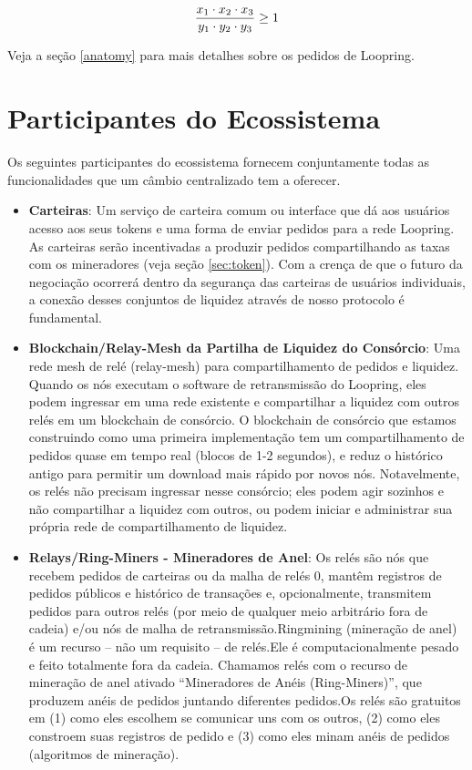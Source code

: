 \documentclass[UTF8,nofonts]{article}
\begin{document}
\begin{multicols}{2}
\begin{equation}
{{x_1 \cdot x_2 \cdot x_3 \over y_1 \cdot y_2 \cdot y_3} \geq 1}
\end{equation}


Veja a seção \ref{anatomy} para mais detalhes sobre os pedidos de Loopring.



\section{Participantes do Ecossistema\label{sec:ecosystem}}
Os seguintes participantes do ecossistema fornecem conjuntamente todas as funcionalidades que um câmbio centralizado tem a oferecer. 

\begin{itemize}

\item \textbf{Carteiras}: Um serviço de carteira comum ou interface que dá aos usuários acesso aos seus tokens e uma forma de enviar pedidos para a rede Loopring. As carteiras serão incentivadas a produzir pedidos compartilhando as taxas com os mineradores (veja seção \ref{sec:token}). Com a crença de que o futuro da negociação ocorrerá dentro da segurança das carteiras de usuários individuais, a conexão desses conjuntos de liquidez através de nosso protocolo é fundamental.

\item \textbf{Blockchain/Relay-Mesh da Partilha de Liquidez do Consórcio}: Uma rede mesh de relé (relay-mesh) para compartilhamento de pedidos e liquidez. Quando os nós executam o software de retransmissão do Loopring, eles podem ingressar em uma rede existente e compartilhar a liquidez com outros relés em um blockchain de consórcio. O blockchain de consórcio que estamos construindo como uma primeira implementação tem um compartilhamento de pedidos quase em tempo real  (blocos de 1-2 segundos), e reduz o histórico antigo para permitir um download mais rápido por novos nós. Notavelmente, os relés não precisam ingressar nesse consórcio; eles podem agir sozinhos e não compartilhar a liquidez com outros, ou podem iniciar e administrar sua própria rede de compartilhamento de liquidez.


\item \textbf{Relays/Ring-Miners - Mineradores de Anel}: 
Os relés são nós que recebem pedidos de carteiras ou da malha de relés 0,  mantêm registros de pedidos públicos e histórico de transações e, opcionalmente, transmitem pedidos para outros relés (por meio de qualquer meio arbitrário fora de cadeia) e/ou nós de malha de retransmissão.Ringmining (mineração de anel) é um recurso -- não um requisito -- de relés.Ele é computacionalmente pesado e feito totalmente fora da cadeia. Chamamos relés com o recurso de mineração de anel ativado “Mineradores de Anéis (Ring-Miners)”, que produzem anéis de pedidos juntando diferentes pedidos.Os relés são gratuitos em (1) como eles escolhem se comunicar uns com os outros, (2) como eles constroem suas registros de pedido e (3) como eles minam anéis de pedidos (algoritmos de mineração).


\end{itemize}
\end{multicols}
\end{document}
